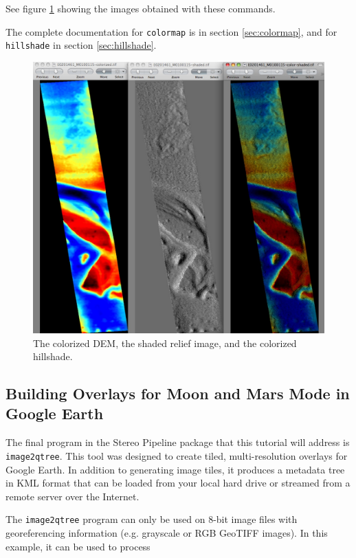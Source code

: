 See figure \ref{hrad-color} showing the images obtained with these commands.

The complete documentation for \texttt{colormap} is in section
\ref{sec:colormap}, and for \texttt{hillshade} in section \ref{sec:hillshade}.

\begin{figure}[b!]
\begin{center}
\includegraphics[width=4.7in]{images/p19-colorized-shaded.png}
\caption[Hrad colorized and shaded relief]{
    \label{hrad-color}
	The colorized DEM, the shaded relief image, and the colorized hillshade.
    }
\end{center}
\end{figure}

\subsection{Building Overlays for Moon and Mars Mode in Google Earth}

The final program in the Stereo Pipeline package that this tutorial
will address is \texttt{image2qtree}.  This tool was designed to
create tiled, multi-resolution overlays for Google Earth.  In addition
to generating image tiles, it produces a metadata tree in KML format
that can be loaded from your local hard drive or streamed from a
remote server over the Internet.

The \texttt{image2qtree} program can only be used on 8-bit image files
with georeferencing information (e.g. grayscale or RGB GeoTIFF
images). In this example, it can be used to process


